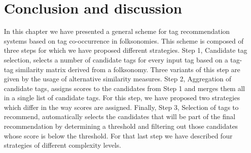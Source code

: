\begin{table} \footnotesize
{}
  \begin{center}
  \caption[Average f-measures after randomising steps of the best scoring tag recommendation methods]{Average f-measures $\fmeasure$ after randomising steps 1, 2 and 3 of the best scoring tag recommendation methods in \textsc{Freesound} and \textsc{Flickr1M}. The ``No rand.'' column shows the performance of the recommendation methods when no steps are randomised.}
  \label{tab:random}
  \end{center}
\end{table}

\section{Conclusion and discussion}
\label{general:sec:discussion}

In this chapter we have presented a general scheme for tag recommendation systems based on tag co-occurrence in folksonomies. This scheme is composed of three steps for which we have proposed different strategies. Step 1, Candidate tag selection, selects a number of candidate tags for every input tag based on a tag-tag similarity matrix derived from a folksonomy. Three variants of this step are given by the usage of alternative similarity measures. Step 2, Aggregation of candidate tags, assigns scores to the candidates from Step 1 and merges them all in a single list of candidate tags. For this step, we have proposed two strategies which differ in the way scores are assigned. Finally, Step 3, Selection of tags to recommend, automatically selects the candidates that will be part of the final recommendation by determining a threshold and filtering out those candidates whose score is below the threshold. For that last step we have described four strategies of different complexity levels. 

